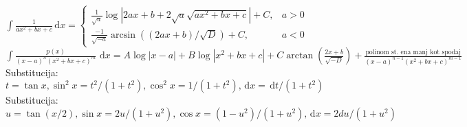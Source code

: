\documentclass[8pt,a4paper]{amsart}
\theoremstyle{definition} %
\theoremstyle{plain} %
\newcommand{\dx}{\ensuremath{\,\mathrm{d}x}}
\newcommand{\dt}{\ensuremath{\,\mathrm{d}t}}
\let\oldint\int
\renewcommand{\int}{\oldint \!}
\begin{document}
$\displaystyle \int \frac{1}{a x^2 + bx + c} \dx =
\begin{cases}
\frac{1}{\sqrt{a}}\log|2ax + b + 2 \sqrt{a} \sqrt{ax^2 + bx + c}|+C, & a >0\\
 \frac{-1}{\sqrt{-a}} \arcsin((2ax + b)/\sqrt{D})+C, & a<0
\end{cases} $\\
$\int \frac{p(x)}{(x-a)^n (x^2 + bx + c)^m} \, \dx = A \log|x - a| + B \log|x^2 + bx + c| + C \arctan(\frac{2x + b}{\sqrt{-D}}) + \frac{\text{polinom st. ena manj kot spodaj}}{(x-a)^{n-1} (x^2 + bx + c)^{m-1}}$ \\

Substitucija: $t = \tan x, \sin^2 x = t^2 /(1 + t^2), \cos^2 x = 1/(1 + t^2), \dx = \dt/(1 + t^2)$\\
Substitucija: $u = \tan (x/2), \sin x = 2 u /(1 + u^2), \cos x = (1-u^2)/(1 + u^2), \dx = 2 du/(1 + u^2)$\\
\end{document}
